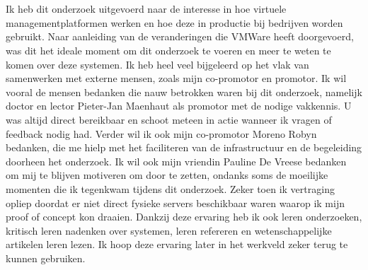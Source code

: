 
\chapter*{}%
\label{ch:voorwoord}


Ik heb dit onderzoek uitgevoerd naar de interesse in hoe virtuele managementplatformen werken en hoe deze in productie bij bedrijven worden gebruikt.
Naar aanleiding van de veranderingen die VMWare heeft doorgevoerd, was dit het ideale moment om dit onderzoek te voeren en meer te weten te komen over deze systemen.
Ik heb heel veel bijgeleerd op het vlak van samenwerken met externe mensen, zoals mijn co-promotor en promotor.
Ik wil vooral de mensen bedanken die nauw betrokken waren bij dit onderzoek, namelijk doctor en lector Pieter-Jan Maenhaut als promotor met de nodige vakkennis. U was altijd direct bereikbaar en schoot meteen in actie wanneer ik vragen of feedback nodig had.
Verder wil ik ook mijn co-promotor Moreno Robyn bedanken, die me hielp met het faciliteren van de infrastructuur en de begeleiding doorheen het onderzoek.
Ik wil ook mijn vriendin Pauline De Vreese bedanken om mij te blijven motiveren om door te zetten, ondanks soms de moeilijke momenten die ik tegenkwam tijdens dit onderzoek.
Zeker toen ik vertraging opliep doordat er niet direct fysieke servers beschikbaar waren waarop ik mijn proof of concept kon draaien.
Dankzij deze ervaring heb ik ook leren onderzoeken, kritisch leren nadenken over systemen, leren refereren en wetenschappelijke artikelen leren lezen.
Ik hoop deze ervaring later in het werkveld zeker terug te kunnen gebruiken.